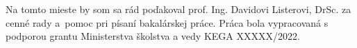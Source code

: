 Na tomto mieste by som sa rád poďakoval
prof. Ing. Davidovi Listerovi, DrSc. za cenné rady
a~pomoc pri písaní bakalárskej práce.
Práca bola vypracovaná s podporou grantu Ministerstva školstva a vedy KEGA XXXXX/2022.